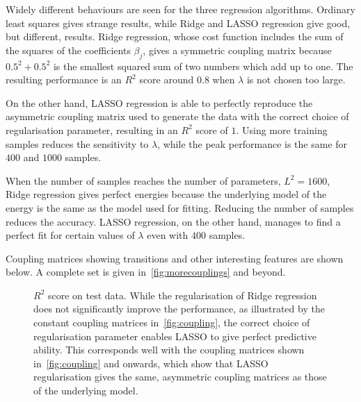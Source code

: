 \documentclass[11pt,british,a4paper]{article}
\numberwithin{equation}{section}
\begin{document}
Widely different behaviours are seen for the three regression algorithms.
Ordinary least squares gives strange results, while Ridge and LASSO regression give good, but different, results.
Ridge regression, whose cost function includes the sum of the squares of the coefficients \(\beta_j\), gives a symmetric coupling matrix because \(\num{0.5}^2+\num{0.5}^2\) is the smallest squared sum of two numbers which add up to one.
The resulting performance is an \(R^2\) score around \(\num{0.8}\) when \(\lambda\) is not chosen too large.

On the other hand, LASSO regression is able to perfectly reproduce the asymmetric coupling matrix used to generate the data with the correct choice of regularisation parameter, resulting in an \(R^2\) score of \(1\). Using more training samples reduces the sensitivity to \(\lambda\), while the peak performance is the same for \(\num{400}\) and \(\num{1000}\) samples.

When the number of samples reaches the number of parameters, \(L^2=\num{1600}\), Ridge regression gives perfect energies because the underlying model of the energy is the same as the model used for fitting. Reducing the number of samples reduces the accuracy. LASSO regression, on the other hand, manages to find a perfect fit for certain values of \(\lambda\) even with \(\num{400}\) samples.

Coupling matrices showing transitions and other interesting features are shown below. A complete set is given in~\vref{fig:morecouplings} and beyond.

\begin{figure}[H]
    \centering
    \caption{\(R^2\) score on test data. While the regularisation of Ridge regression does not significantly improve the performance, as illustrated by the constant coupling matrices in~\vref{fig:coupling}, the correct choice of regularisation parameter enables LASSO to give perfect predictive ability. This corresponds well with the coupling matrices shown in~\ref{fig:coupling} and onwards, which show that LASSO regularisation gives the same, asymmetric coupling matrices as those of the underlying model.}\label{fig:r2}
\end{figure}
\end{document}
